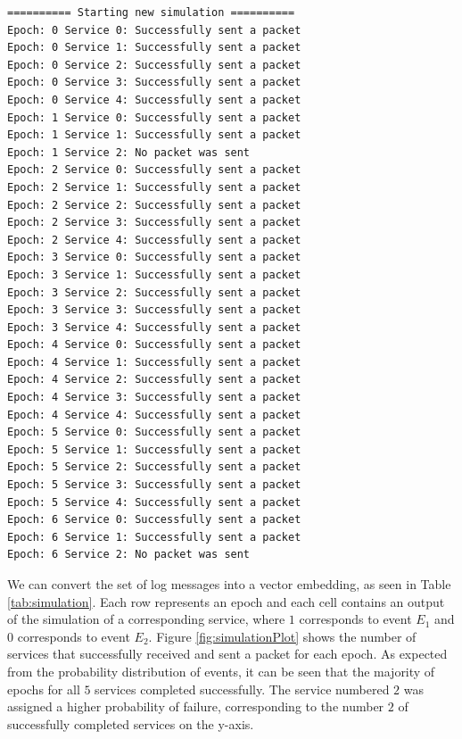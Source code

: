 \begin{verbatim}
========== Starting new simulation ==========
Epoch: 0 Service 0: Successfully sent a packet
Epoch: 0 Service 1: Successfully sent a packet
Epoch: 0 Service 2: Successfully sent a packet
Epoch: 0 Service 3: Successfully sent a packet
Epoch: 0 Service 4: Successfully sent a packet
Epoch: 1 Service 0: Successfully sent a packet
Epoch: 1 Service 1: Successfully sent a packet
Epoch: 1 Service 2: No packet was sent
Epoch: 2 Service 0: Successfully sent a packet
Epoch: 2 Service 1: Successfully sent a packet
Epoch: 2 Service 2: Successfully sent a packet
Epoch: 2 Service 3: Successfully sent a packet
Epoch: 2 Service 4: Successfully sent a packet
Epoch: 3 Service 0: Successfully sent a packet
Epoch: 3 Service 1: Successfully sent a packet
Epoch: 3 Service 2: Successfully sent a packet
Epoch: 3 Service 3: Successfully sent a packet
Epoch: 3 Service 4: Successfully sent a packet
Epoch: 4 Service 0: Successfully sent a packet
Epoch: 4 Service 1: Successfully sent a packet
Epoch: 4 Service 2: Successfully sent a packet
Epoch: 4 Service 3: Successfully sent a packet
Epoch: 4 Service 4: Successfully sent a packet
Epoch: 5 Service 0: Successfully sent a packet
Epoch: 5 Service 1: Successfully sent a packet
Epoch: 5 Service 2: Successfully sent a packet
Epoch: 5 Service 3: Successfully sent a packet
Epoch: 5 Service 4: Successfully sent a packet
Epoch: 6 Service 0: Successfully sent a packet
Epoch: 6 Service 1: Successfully sent a packet
Epoch: 6 Service 2: No packet was sent
 \end{verbatim}
 
We can convert the set of log messages into a vector embedding, as seen in Table \ref{tab:simulation}. Each row represents an epoch and each cell contains an output of the simulation of a corresponding service, where $1$ corresponds to event $E_1$ and $0$ corresponds to event $E_2$. Figure \ref{fig:simulationPlot} shows the number of services that successfully received and sent a packet for each epoch. As expected from the probability distribution of events, it can be seen that the majority of epochs for all $5$ services completed successfully. The service numbered $2$ was assigned a higher probability of failure, corresponding to the number $2$ of successfully completed services on the y-axis. 

